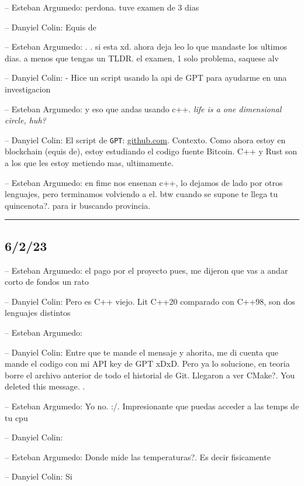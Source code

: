 -- Esteban Argumedo: perdona. tuve examen de 3 dias

-- Danyiel Colin: Equis de

-- Esteban Argumedo: . . si esta xd. ahora deja leo lo que mandaste los
ultimos dias. a menos que tengas un TLDR. el examen, 1 solo problema,
saquese alv

-- Danyiel Colin: - Hice un script usando la api de GPT para ayudarme en
una investigacion

-- Esteban Argumedo: y eso que andas usando c++. \emph{life is a one
dimensional circle, huh?}

-- Danyiel Colin: El script de \texttt{GPT}:
\href{https://github.com/DanEscher98/EmbeddedScripts/blob/main/Scripts/CoolScripts/gpt_rust_cwe.sh}{github.com}.
Contexto. Como ahora estoy en blockchain (equis de), estoy estudiando el
codigo fuente Bitcoin. C++ y Rust son a los que les estoy metiendo mas,
ultimamente.

-- Esteban Argumedo: en fime nos ensenan c++, lo dejamos de lado por
otros lenguajes, pero terminamos volviendo a el. btw cuando se supone te
llega tu quincenota?. para ir buscando provincia.

\begin{center}\rule{0.5\linewidth}{0.5pt}\end{center}

\hypertarget{section-209}{%
\subsection{6/2/23}\label{section-209}}

-- Esteban Argumedo: el pago por el proyecto pues, me dijeron que vas a
andar corto de fondos un rato

-- Danyiel Colin: Pero es C++ viejo. Lit C++20 comparado con C++98, son
dos lenguajes distintos

-- Esteban Argumedo:

-- Danyiel Colin: Entre que te mande el mensaje y ahorita, me di cuenta
que mande el codigo con mi API key de GPT xDxD. Pero ya lo solucione, en
teoria borre el archivo anterior de todo el historial de Git. Llegaron a
ver CMake?. You deleted this message. .

-- Esteban Argumedo: Yo no. :/. Impresionante que puedas acceder a las
temps de tu cpu

-- Danyiel Colin:

-- Esteban Argumedo: Donde mide las temperaturas?. Es decir fisicamente

-- Danyiel Colin: Si

